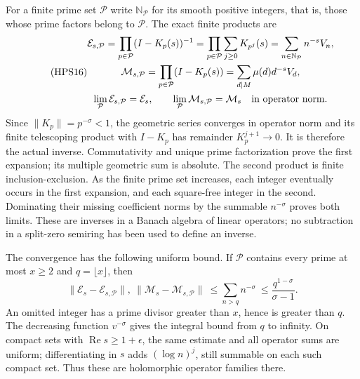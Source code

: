 For a finite prime set $\mathcal P$ write
$\mathbb N_{\mathcal P}$ for its smooth positive
integers, that is, those whose prime factors
belong to $\mathcal P$. The exact finite products are
\begin{equation}\tag{HPS16}
\begin{gathered}
 \mathcal E_{s,\mathcal P}
   =\prod_{p\in\mathcal P}(I-K_p(s))^{-1}
   =\prod_{p\in\mathcal P}\sum_{j\ge0}K_{p^j}(s)
   =\sum_{n\in\mathbb N_{\mathcal P}}n^{-s}V_n,\\
 \mathcal M_{s,\mathcal P}
   =\prod_{p\in\mathcal P}(I-K_p(s))
   =\sum_{d\mid M}\mu(d)d^{-s}V_d,\\
 \lim_{\mathcal P}\mathcal E_{s,\mathcal P}
       =\mathcal E_s,\qquad
 \lim_{\mathcal P}\mathcal M_{s,\mathcal P}
       =\mathcal M_s
                           \quad\hbox{in operator norm}.
\end{gathered}
\end{equation}
Since $\|K_p\|=p^{-\sigma}<1$, the geometric
series converges in operator norm and its
finite telescoping product with $I-K_p$
has remainder $K_p^{j+1}\to0$. It is therefore
the actual inverse. Commutativity and unique
prime factorization prove the first expansion;
its multiple geometric sum is absolute.
The second product is finite inclusion-exclusion.
As the finite prime set increases, each integer
eventually occurs in the first expansion, and
each square-free integer in the second.
Dominating their missing coefficient norms by
the summable $n^{-\sigma}$ proves both limits.
These are inverses in a Banach algebra of linear
operators; no subtraction in a split-zero
semiring has been used to define an inverse.

The convergence has the following uniform bound.
If $\mathcal P$ contains every prime at most
$x\ge2$ and $q=\lfloor x\rfloor$, then
\begin{equation}\tag{HPS17}
 \|\mathcal E_s-\mathcal E_{s,\mathcal P}\|,
 \ \|\mathcal M_s-\mathcal M_{s,\mathcal P}\|
 \ \le\sum_{n>q}n^{-\sigma}
 \ \le\frac{q^{1-\sigma}}{\sigma-1}.
\end{equation}
An omitted integer has a prime divisor greater
than $x$, hence is greater than $q$.
The decreasing function $v^{-\sigma}$ gives
the integral bound from $q$ to infinity.
On compact sets with $\operatorname{Re}s\ge
1+\epsilon$, the same estimate and all
operator sums are uniform; differentiating
in $s$ adds $(\log n)^j$, still summable
on each such compact set. Thus these are
holomorphic operator families there.

